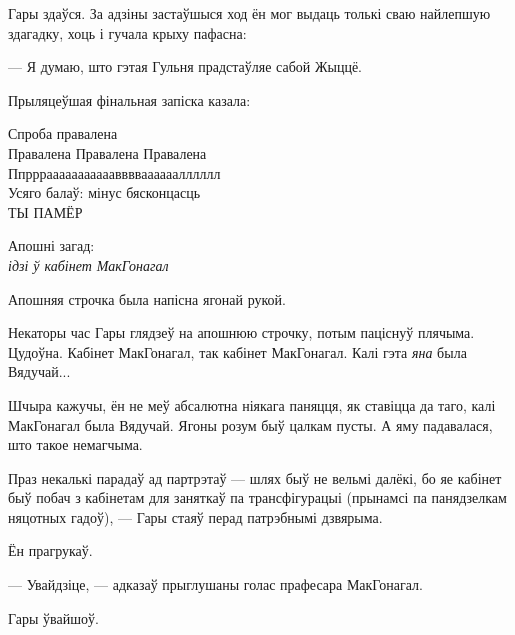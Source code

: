 Гары здаўся. За адзіны застаўшыся ход ён мог выдаць толькі сваю найлепшую здагадку,
хоць і гучала крыху пафасна:

--- Я думаю, што гэтая Гульня прадстаўляе сабой Жыццё.

Прыляцеўшая фінальная запіска казала:

\begin{writtenNoteGame}
Спроба правалена\\
Правалена Правалена Правалена\\
Ппрррааааааааааавввваааааалллллл\\
Усяго балаў: мінус бясконцасць\\
\MakeUppercase{Ты памёр}

\hpFontFasthand{}Апошні загад:\\
\emph{ідзі ў кабінет МакГонагал}
\end{writtenNoteGame}

Апошняя строчка была напісна ягонай рукой.

Некаторы час Гары глядзеў на апошнюю строчку, потым паціснуў плячыма. Цудоўна.
Кабінет МакГонагал, так кабінет МакГонагал. Калі гэта \emph{яна} была Вядучай...

Шчыра кажучы, ён не меў абсалютна ніякага паняцця, як ставіцца да таго, калі 
МакГонагал была Вядучай. Ягоны розум быў цалкам пусты. А яму падавалася, што 
такое немагчыма.

Праз некалькі парадаў ад партрэтаў --- шлях быў не вельмі далёкі, бо яе кабінет быў
побач з кабінетам для заняткаў па трансфігурацыі (прынамсі па панядзелкам няцотных
гадоў), --- Гары стаяў перад патрэбнымі дзвярыма.

Ён прагрукаў.

--- Увайдзіце, --- адказаў прыглушаны голас прафесара МакГонагал.

Гары ўвайшоў.
